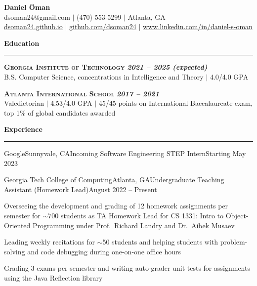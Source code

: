 \documentclass{article}
\newcommand{\horizontal}{\vspace{2pt}\hrule}
\newcommand{\school}[3]{\vspace{2pt}\textsc{\textbf{#1}} \hfill \textbf{\textit{#2}} \\ #3}
\newcommand{\sectitle}[1]{\vspace{2pt} \textbf{\large #1} \horizontal}
\begin{document}
\thispagestyle{empty}
\begin{center}
    \textbf{\LARGE Daniel Öman} \\
    dsoman24@gmail.com $|$ (470) 553-5299 $|$ Atlanta, GA \\
    \href{https://dsoman24.github.io/}{dsoman24.github.io} $|$ \href{https://github.com/dsoman24}{github.com/dsoman24} $|$ \href{https://www.linkedin.com/in/daniel-s-oman/}{www.linkedin.com/in/daniel-s-oman}
\end{center}

\begin{flushleft}
\sectitle{Education}

\school{Georgia Institute of Technology}{2021 -- 2025 (expected)}
{B.S. Computer Science, concentrations in Intelligence and Theory $|$ 4.0/4.0 GPA}

\school{Atlanta International School}{2017 -- 2021}
{Valedictorian $|$ 4.53/4.0 GPA $|$ 45/45 points on International Baccalaureate exam, top 1\% of global candidates awarded}

\sectitle{Experience}

    \begin{experience_no_list}{Google}{Sunnyvale, CA}{Incoming Software Engineering STEP Intern}{Starting May 2023}
    \end{experience_no_list}

    \begin{experience}{Georgia Tech College of Computing}{Atlanta, GA}{Undergraduate Teaching Assistant (Homework Lead)}{August 2022 -- Present}
        \item Overseeing the development and grading of 12 homework assignments per semester for $\sim$700 students as TA Homework Lead for CS 1331: Intro to Object-Oriented Programming under Prof.~Richard Landry and Dr.~Aibek Musaev
        \item Leading weekly recitations for $\sim$50 students and helping students with problem-solving and code debugging during one-on-one office hours
        \item Grading 3 exams per semester and writing auto-grader unit tests for assignments using the Java Reflection library
    \end{experience}


\end{flushleft}
\end{document}
